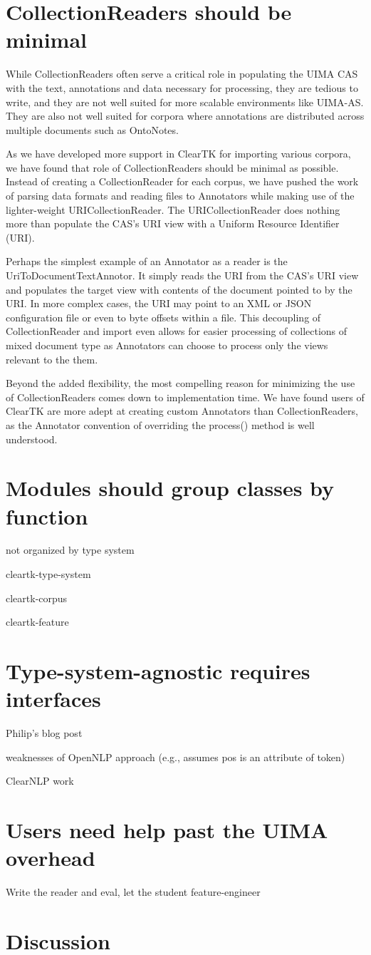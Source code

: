 \documentclass[10pt, a4paper]{article}
\begin{document}
\section{CollectionReaders should be minimal}

While CollectionReaders often serve a critical role in populating the UIMA CAS with the text, annotations and data necessary for processing, they are tedious to write, and they are not well suited for more scalable environments like UIMA-AS.  They are also not well suited for corpora where annotations are distributed across multiple documents such as OntoNotes.

As we have developed more support in ClearTK for importing various corpora, we have found that role of CollectionReaders should be minimal as possible.  Instead of creating a CollectionReader for each corpus, we have pushed the work of parsing data formats and reading files to Annotators while making use of the lighter-weight URICollectionReader.  The URICollectionReader does nothing more than populate the CAS's URI view with a Uniform Resource Identifier (URI).  

Perhaps the simplest example of an Annotator as a reader is the UriToDocumentTextAnnotor. It simply reads the URI from the CAS's URI view and populates the target view with contents of the document pointed to by the URI.  In more complex cases, the URI may point to an XML or JSON configuration file or even to byte offsets within a file.  This decoupling of CollectionReader and import even allows for easier processing of collections of mixed document type as Annotators can choose to process only the views relevant to the them.

Beyond the added flexibility, the most compelling reason for minimizing the use of CollectionReaders comes down to implementation time.  We have found users of ClearTK are more adept at creating custom Annotators than CollectionReaders, as the Annotator convention of overriding the process() method is well understood.


\section{Modules should group classes by function}
not organized by type system

cleartk-type-system

cleartk-corpus

cleartk-feature


\section{Type-system-agnostic requires interfaces}

Philip's blog post

weaknesses of OpenNLP approach (e.g., assumes pos is an attribute of token)

ClearNLP work


\section{Users need help past the UIMA overhead}

Write the reader and eval, let the student feature-engineer


\section{Discussion}



\end{document}
